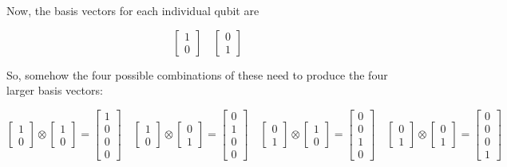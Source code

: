 \documentclass[main.tex]{subfiles}
\begin{document}
    Now, the basis vectors for each individual qubit are
    
    $$
    \left[\begin{array}{l}
    1 \\
    0
    \end{array}\right] \quad\left[\begin{array}{l}
    0 \\
    1
    \end{array}\right]
    $$
    
    So, somehow the four possible combinations of these need to produce the four larger basis vectors:
    
    $$
    \left[\begin{array}{l}
    1 \\
    0
    \end{array}\right] \otimes\left[\begin{array}{l}
    1 \\
    0
    \end{array}\right]=\left[\begin{array}{l}
    1 \\
    0 \\
    0 \\
    0
    \end{array}\right] \quad\left[\begin{array}{l}
    1 \\
    0
    \end{array}\right] \otimes\left[\begin{array}{l}
    0 \\
    1
    \end{array}\right]=\left[\begin{array}{l}
    0 \\
    1 \\
    0 \\
    0
    \end{array}\right] \quad\left[\begin{array}{l}
    0 \\
    1
    \end{array}\right] \otimes\left[\begin{array}{l}
    1 \\
    0
    \end{array}\right]=\left[\begin{array}{l}
    0 \\
    0 \\
    1 \\
    0
    \end{array}\right] \quad\left[\begin{array}{l}
    0 \\
    1
    \end{array}\right] \otimes\left[\begin{array}{l}
    0 \\
    1
    \end{array}\right]=\left[\begin{array}{l}
    0 \\
    0 \\
    0 \\
    1
    \end{array}\right]
    $$
    
\end{document}
